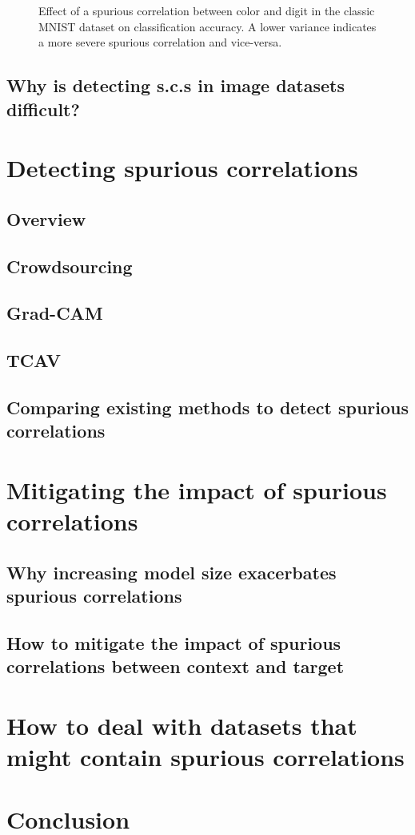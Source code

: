 \documentclass{article}
\begin{document}
\begin{figure}[!ht]
    \centering
    \caption{Effect of a spurious correlation between color and digit in the classic MNIST dataset on classification accuracy. A lower variance indicates a more severe spurious correlation and vice-versa.}
    \label{fig:mnist_graph}
\end{figure}

\subsection{Why is detecting s.c.s in image datasets difficult?}

\section{Detecting spurious correlations}
\subsection{Overview}
\subsection{Crowdsourcing}
\subsection{Grad-CAM}
\subsection{TCAV}
\subsection{Comparing existing methods to detect spurious correlations}

\section{Mitigating the impact of spurious correlations}
\subsection{Why increasing model size exacerbates spurious correlations}
\subsection{How to mitigate the impact of spurious correlations between context and target}

\section{How to deal with datasets that might contain spurious correlations}

\section{Conclusion}

\printbibliography
\end{document}
